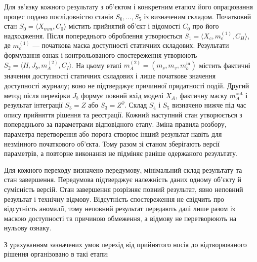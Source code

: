 

Для зв’язку кожного результату з об’єктом і конкретним етапом його опрацювання процес подано послідовністю станів $S_0,\ldots,S_5$ із визначеним складом. Початковий стан $S_0=\langle X_{mm},C_0\rangle$ містить прийнятий об’єкт і відомості $C_0$ про його надходження. Після попереднього оброблення утворюється $S_1=\langle X_c,m_c^{(1)},C_H\rangle$, де $m_c^{(1)}$ --- початкова маска доступності статичних складових. Результати формування ознак і контрольованого спостереження утворюють $S_2=\langle H,J_b,m_A^{(2)},C_I\rangle$. На цьому етапі $m_A^{(2)}=(m_s,m_v,m_b^{\mathrm{in}})$ містить фактичні значення доступності статичних складових і лише початкове значення доступності журналу; воно не підтверджує причинної придатності подій. Другий метод після перевірки $J_b$ формує повний вхід моделі $X_A$, фактичну маску $m_A^{\mathrm{out}}$ і результат інтеграції $S_3=Z$ або $S_3=Z^{\partial}$. Склад $S_4$ і $S_5$ визначено нижче під час опису прийняття рішення та реєстрації. Кожний наступний стан утворюється з попереднього за параметрами відповідного етапу. Зміна правила розбору, параметра перетворення або порога створює інший результат навіть для незмінного початкового об’єкта. Тому разом зі станом зберігають версії параметрів, а повторне виконання не підміняє раніше одержаного результату.

Для кожного переходу визначено передумову, мінімальний склад результату та стан завершення. Передумова підтверджує належність даних одному об’єкту й сумісність версій. Стан завершення розрізняє повний результат, явно неповний результат і технічну відмову. Відсутність спостереження не свідчить про відсутність аномалії, тому неповний результат передають далі лише разом із маскою доступності та причиною обмеження, а відмову не перетворюють на нульову ознаку.

З урахуванням зазначених умов перехід від прийнятого носія до відтворюваного рішення організовано в такі етапи:

